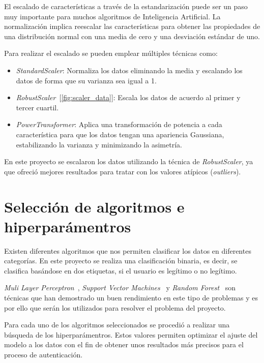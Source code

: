 El escalado de características a través de la estandarización puede ser un paso muy importante para muchos algoritmos de Inteligencia Artificial. La normalización implica reescalar las características para obtener las propiedades de una distribución normal con una media de cero y una desviación estándar de uno.

Para realizar el escalado se pueden emplear múltiples técnicas como:

\begin{itemize}
    \item \textit{StandardScaler}: Normaliza los datos eliminando la media y escalando los datos de forma que su varianza sea igual a 1.
    \item \textit{RobustScaler}~[\cref{fig:scaler_data}]: Escala los datos de acuerdo al primer y tercer cuartil. 
    \item \textit{PowerTransformer}: Aplica una transformación de potencia a cada característica para que los datos tengan una apariencia Gaussiana, estabilizando la varianza y minimizando la asimetría.
\end{itemize}

En este proyecto se escalaron los datos utilizando la técnica de \textit{RobustScaler}, ya que ofreció mejores resultados para tratar con los valores atípicos (\textit{outliers}).




\section{Selección de algoritmos e hiperparámentros}
\label{sec:ia:rf_selection}

Existen diferentes algoritmos que nos permiten clasificar los datos en diferentes categorías. En este proyecto se realiza una clasificación binaria, es decir, se clasifica basándose en dos etiquetas, si el usuario es legítimo o no legítimo.

\textit{Muli Layer Perceptron}~\cite{rosenblatt1960perceptron}, \textit{Support Vector Machines}~\cite{berwick2003idiot} y \textit{Random Forest}~\cite{Breiman2001} son técnicas que han demostrado un buen rendimiento en este tipo de problemas y es por ello que serán los utilizados para resolver el problema del proyecto.

Para cada uno de los algoritmos seleccionados se procedió a realizar una búsqueda de los hiperparámentros. Estos valores permiten optimizar el ajuste del modelo a los datos con el fin de obtener unos resultados más precisos para el proceso de autenticación.

